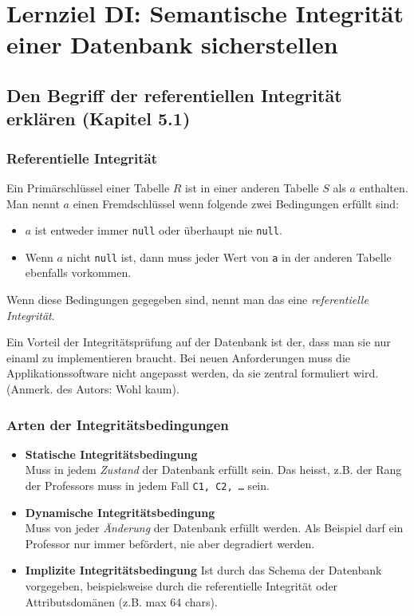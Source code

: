 \section{Lernziel DI: Semantische Integrität einer Datenbank sicherstellen}

\subsection{Den Begriff der referentiellen Integrität erklären (Kapitel 5.1)}
\subsubsection{Referentielle Integrität}
Ein Primärschlüssel einer Tabelle \(R\) ist in einer anderen Tabelle \(S\) als \(a\) enthalten. Man nennt \(a\) einen Fremdschlüssel wenn folgende zwei Bedingungen erfüllt sind:

\begin{itemize}
  \item \(a\) ist entweder immer \texttt{null} oder überhaupt nie \texttt{null}.
  \item Wenn \(a\) nicht \texttt{null} ist, dann muss jeder Wert von \texttt{a} in der anderen Tabelle ebenfalls vorkommen.
\end{itemize}
Wenn diese Bedingungen gegegeben sind, nennt man das eine \emph{referentielle Integrität}. 

Ein Vorteil der Integritätsprüfung auf der Datenbank ist der, dass man sie nur einaml zu implementieren braucht. Bei neuen Anforderungen muss die Applikationssoftware nicht angepasst werden, da sie zentral formuliert wird. (Anmerk. des Autors: Wohl kaum).

\subsubsection{Arten der Integritätsbedingungen}
\begin{itemize}
    \item \textbf{Statische Integritätsbedingung} \\
    Muss in jedem \emph{Zustand} der Datenbank erfüllt sein. Das heisst, z.B. der Rang der Professors muss in jedem Fall \texttt{C1, C2, \dots } sein.
    \item \textbf{Dynamische Integritätsbedingung} \\
    Muss von jeder \emph{Änderung} der Datenbank erfüllt werden. Als Beispiel darf ein Professor nur immer befördert, nie aber degradiert werden.
    \item \textbf{Implizite Integritätsbedingung}
    Ist durch das Schema der Datenbank vorgegeben, beispielsweise durch die referentielle Integrität oder Attributsdomänen (z.B. max 64 chars).
\end{itemize}



